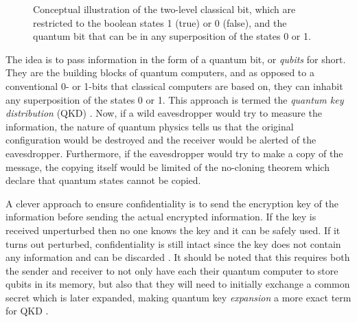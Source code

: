\begin{figure}
  \centering
  \caption{Conceptual illustration of the two-level classical bit, which are restricted to the boolean states 1 (true) or 0 (false), and the quantum bit that can be in any superposition of the states 0 or 1.}
  \label{fig:qubit and bit}
\end{figure}
The idea is to pass information in the form of a quantum bit, or \textit{qubits} for short. They are the building blocks of quantum computers, and as opposed to a conventional 0- or 1-bits that classical computers are based on, they can inhabit any superposition of the states 0 or 1. This approach is termed the \textit{quantum key distribution} (QKD) \cite{Gisin2002, Gisin2007}. Now, if a wild eavesdropper would try to measure the information, the nature of quantum physics tells us that the original configuration would be destroyed and the receiver would be alerted of the eavesdropper. Furthermore, if the eavesdropper would try to make a copy of the message, the copying itself would be limited of the no-cloning theorem \cite{Gisin2002} which declare that quantum states cannot be copied.

A clever approach to ensure confidentiality is to send the encryption key of the information before sending the actual encrypted information. If the key is received unperturbed then no one knows the key and it can be safely used. If it turns out perturbed, confidentiality is still intact since the key does not contain any information and can be discarded \cite{Gisin2002}. It should be noted that this requires both the sender and receiver to not only have each their quantum computer to store qubits in its memory, but also that they will need to initially exchange a common secret which is later expanded, making quantum key \textit{expansion} a more exact term for QKD \cite{Pavicic2006, Gisin2007}.

